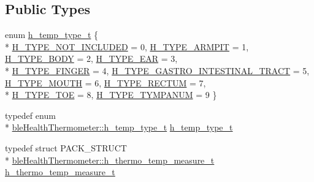 \subsection*{Public Types}
\begin{DoxyCompactItemize}
\item 
enum \hyperlink{classble_health_thermometer_ac18502532d0b3bfeeeb10f7929695a3f}{h\-\_\-temp\-\_\-type\-\_\-t} \{ \\*
\hyperlink{classble_health_thermometer_ac18502532d0b3bfeeeb10f7929695a3fae7439c25f80adab1352472d283c75ea8}{H\-\_\-\-T\-Y\-P\-E\-\_\-\-N\-O\-T\-\_\-\-I\-N\-C\-L\-U\-D\-E\-D} = 0, 
\hyperlink{classble_health_thermometer_ac18502532d0b3bfeeeb10f7929695a3fa62e5ca761358edb08cbdd5b62ecffbfb}{H\-\_\-\-T\-Y\-P\-E\-\_\-\-A\-R\-M\-P\-I\-T} = 1, 
\hyperlink{classble_health_thermometer_ac18502532d0b3bfeeeb10f7929695a3fae0107273fc4c02c6591f112039865402}{H\-\_\-\-T\-Y\-P\-E\-\_\-\-B\-O\-D\-Y} = 2, 
\hyperlink{classble_health_thermometer_ac18502532d0b3bfeeeb10f7929695a3fabda736bcad715b24dbdec529a1f5079b}{H\-\_\-\-T\-Y\-P\-E\-\_\-\-E\-A\-R} = 3, 
\\*
\hyperlink{classble_health_thermometer_ac18502532d0b3bfeeeb10f7929695a3fa3c6fd5a74181a0a9370eb795c70bff3d}{H\-\_\-\-T\-Y\-P\-E\-\_\-\-F\-I\-N\-G\-E\-R} = 4, 
\hyperlink{classble_health_thermometer_ac18502532d0b3bfeeeb10f7929695a3fafe5c5726306d485ce31792937f1539ee}{H\-\_\-\-T\-Y\-P\-E\-\_\-\-G\-A\-S\-T\-R\-O\-\_\-\-I\-N\-T\-E\-S\-T\-I\-N\-A\-L\-\_\-\-T\-R\-A\-C\-T} = 5, 
\hyperlink{classble_health_thermometer_ac18502532d0b3bfeeeb10f7929695a3fa4c872f53be7187fb68427e7b24d570d2}{H\-\_\-\-T\-Y\-P\-E\-\_\-\-M\-O\-U\-T\-H} = 6, 
\hyperlink{classble_health_thermometer_ac18502532d0b3bfeeeb10f7929695a3fa8b8de09a2dc7d91f1b239c50cf876c5e}{H\-\_\-\-T\-Y\-P\-E\-\_\-\-R\-E\-C\-T\-U\-M} = 7, 
\\*
\hyperlink{classble_health_thermometer_ac18502532d0b3bfeeeb10f7929695a3fa00ec167e9b16609fcab71ef9c1341c77}{H\-\_\-\-T\-Y\-P\-E\-\_\-\-T\-O\-E} = 8, 
\hyperlink{classble_health_thermometer_ac18502532d0b3bfeeeb10f7929695a3fa1560a404018fd093be6784b48fa7c3de}{H\-\_\-\-T\-Y\-P\-E\-\_\-\-T\-Y\-M\-P\-A\-N\-U\-M} = 9
 \}
\item 
typedef enum \\*
\hyperlink{classble_health_thermometer_ac18502532d0b3bfeeeb10f7929695a3f}{ble\-Health\-Thermometer\-::h\-\_\-temp\-\_\-type\-\_\-t} \hyperlink{classble_health_thermometer_a2858081f04462ae92275fd54dc0b52d3}{h\-\_\-temp\-\_\-type\-\_\-t}
\item 
typedef struct P\-A\-C\-K\-\_\-\-S\-T\-R\-U\-C\-T \\*
\hyperlink{structble_health_thermometer_1_1h__thermo__temp__measure__t}{ble\-Health\-Thermometer\-::h\-\_\-thermo\-\_\-temp\-\_\-measure\-\_\-t} \hyperlink{classble_health_thermometer_acf0724e2e0cb746c2c175ec34d226efb}{h\-\_\-thermo\-\_\-temp\-\_\-measure\-\_\-t}
\end{DoxyCompactItemize}
